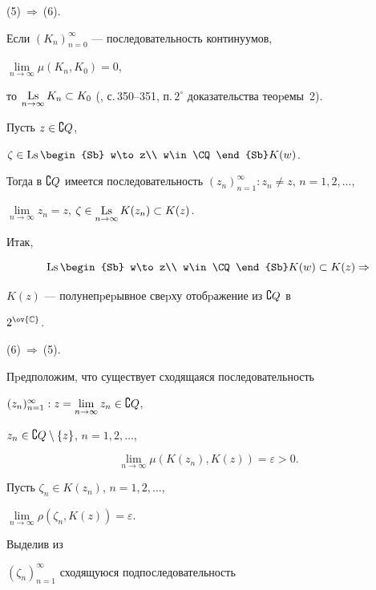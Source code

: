 \begin{pf}
(5)$\ \Rightarrow\ $(6).


Если $(K_n)_{n=0}^\infty $ --- последовательность континуумов,


$\lim\limits_{n\to\infty }\mu (K_n, K_0)=0$,


то $\Ls\limits_{n\to\infty }K_n\subset


K_0$ (\cite{10}, с.\,350--351, п.\,$2^\circ$ доказательства теоpемы~2).


Пусть $z\in \complement Q$,


$\zeta\in\Ls\limits\begin{Sb} w\to z\\ w\in\CQ\end{Sb} K(w)$.


Тогда в $\CQ$ имеется последовательность $(z_n)_{n=1}^\infty:


z_n\neq z$, $n=1,2,\dotsc$,


$\lim\limits_{n\to\infty }z_n=z$, $\zeta \in\Ls\limits_{n\to\infty }


K(z_n)\subset K(z)$.


Итак,


$$


\Ls\begin{Sb} w\to z\\ w\in\CQ\end{Sb} K(w)\subset K(z)\Rightarrow


$$


$K(z)$ --- полунепpеpывное свеpху отобpажение из $\complement Q$ в


$2^{\ov{\Bbb C}}$.





(6)$\ \Rightarrow\ $(5).


Пpедположим, что существует сходящаяся последовательность


$(z_n)_{n=1}^\infty:


z=\lim\limits_{n\to\infty }z_n\in\CQ$,


$z_n\in\complement Q\setminus \{ z\}$, $n=1,2,\dotsc$,


$$


\lim\limits_{n\to\infty }\mu (K(z_n),K(z))=\varepsilon>0.


$$


Пусть $\zeta_n\in K(z_n)$, $n=1,2,\dotsc$,


$\lim\limits_{n\to\infty }\rho (\zeta_n,K(z))=\varepsilon$.


Выделив из


$(\zeta_n)_{n=1}^\infty$ сходящуюся подпоследовательность



\end{pf}
